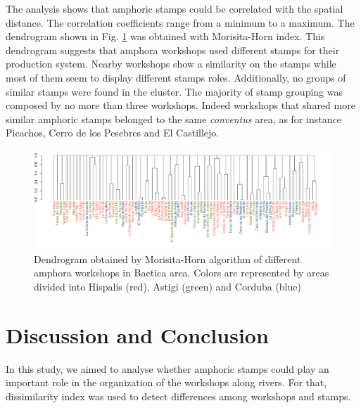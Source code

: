 \documentclass[review]{elsarticle}
\begin{document}
The analysis shows that amphoric stamps could be correlated with the spatial distance. The correlation coefficients range from a minimum to a maximum. The dendrogram shown in Fig. \ref{dendro} was obtained with Morisita-Horn index. This dendrogram suggests that amphora workshops used different stamps for their production system. Nearby workshops show a similarity on the stamps while most of them seem to display different stamps roles. Additionally, no groups of similar stamps were found in the cluster. The majority of stamp grouping was composed by no more than three workshops. Indeed workshops that shared more similar amphoric stamps belonged to the same \textit{conventus} area, as for instance Picachos, Cerro de los Pesebres and El Castillejo. 

\begin{figure}[htp]
	\centering
\includegraphics[width=\linewidth]{figs/dendro}
\caption{Dendrogram obtained by Morisita-Horn algorithm of different amphora workshops in Baetica area. Colors are represented by areas divided into Hispalis (red), Astigi (green) and Corduba (blue)}
\label{dendro}
\end{figure} 





\section{Discussion and Conclusion}



In this study, we aimed to analyse whether amphoric stamps could play an important role in the organization of the workshops along rivers. For that, dissimilarity index was used to detect differences among workshops and stamps. 
\end{document}
